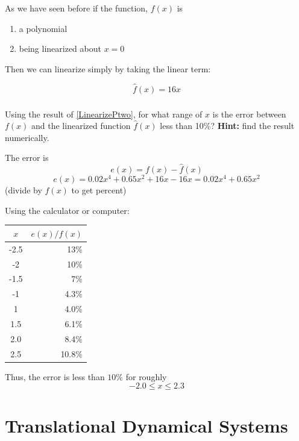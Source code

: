 \documentclass{article}	%
\begin{document}
\begin{solution}
As we have seen before if the function, $f(x)$ is
\begin{enumerate}
  \item a polynomial
  \item being linearized about $x=0$
\end{enumerate}

Then we can linearize simply by taking the linear term:

\[
\hat{f}(x) = 16x
\]
\end{solution}



\subsubsection{}
Using the result of \ref{LinearizePtwo}, for what range of $x$ is the error between $f(x)$ and the linearized function $\hat{f}(x)$ less than 10\%?
{\bf Hint:} find the result numerically.


\begin{solution}
The error is
\[
e(x) = f(x) - \hat{f}(x)
\]
\[
e(x) = 0.02x^4  +  0.65x^2+ 16x - 16x  = 0.02x^4  +  0.65x^2
\]
(divide by $f(x)$ to get percent)

Using the calculator or computer:

\begin{center}
\begin{tabular}{cr}
$x$      &   $e(x)/f(x)$ \\ \hline
-2.5	& 13\% \\
-2	& 10\% \\
-1.5	& 7\% \\
-1	& 4.3\% \\
1	& 4.0\% \\
1.5	& 6.1\% \\
2.0	& 8.4\% \\
2.5	& 10.8\% \\
\end{tabular}
\end{center}

Thus, the error is less than $10\%$ for roughly
\[
-2.0 \leq x \leq 2.3
\]
\end{solution}






\newpage
\section{Translational Dynamical Systems}
\end{document}
